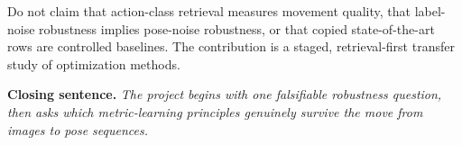 \documentclass[10pt]{article}
\begin{document}
\begin{warnbox}[title=\textbf{Do not claim}]
Do not claim that action-class retrieval measures movement quality, that label-noise robustness implies pose-noise robustness, or that copied state-of-the-art rows are controlled baselines. The contribution is a staged, retrieval-first transfer study of optimization methods.
\end{warnbox}

\textbf{Closing sentence.} \emph{The project begins with one falsifiable robustness question, then asks which metric-learning principles genuinely survive the move from images to pose sequences.}
\end{document}
